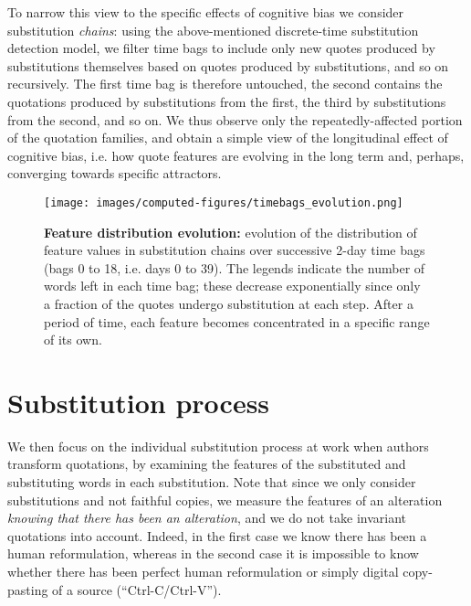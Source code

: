 \bigskip
To narrow this view to the specific effects of cognitive bias we consider substitution \emph{chains}: using the above-mentioned discrete-time substitution detection model, we filter time bags to include only new quotes produced by substitutions themselves based on quotes produced by substitutions, and so on recursively.
The first time bag is therefore untouched, the second contains the quotations produced by substitutions from the first, the third by substitutions from the second, and so on.  
We thus observe only the repeatedly-affected portion of the quotation families, and obtain a simple view of the longitudinal effect of cognitive bias, \hbox{i.e.} how quote features are evolving in the long term and, perhaps, converging towards specific attractors.

\begin{figure*}[!th]
    \centering
    \texttt{[image: images/computed-figures/timebags\_evolution.png]}
    \caption{\textbf{Feature distribution evolution:} evolution of the distribution of feature values in substitution chains over successive 2-day time bags (bags 0 to 18, i.e. days 0 to 39).
    The legends indicate the number of words left in each time bag; these decrease exponentially since only a fraction of the quotes undergo substitution at each step.
    After a period of time, each feature becomes concentrated in a specific range of its own.}
    \label{fig:timebags-evolution}
\end{figure*}

\section{Substitution process}

We then focus on the individual substitution process at work when authors transform quotations, by examining the features of the substituted and substituting words in each substitution.
Note that since we only consider substitutions and not faithful copies, we measure the features of an alteration \emph{knowing that there has been an alteration}, and we do not take invariant quotations into account.
Indeed, in the first case we know there has been a human reformulation, whereas in the second case it is impossible to know whether there has been perfect human reformulation or simply digital copy-pasting of a source (``{\sc Ctrl-C}/{\sc Ctrl-V}'').

